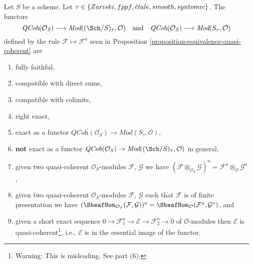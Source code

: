 \begin{lemma}
\label{lemma-equivalence-quasi-coherent-limits}
Let $S$ be a scheme.
Let $\tau \in \{Zariski, \linebreak[0] fppf, \linebreak[0]
\acute{e}tale, \linebreak[0] smooth, \linebreak[0] syntomic\}$.
The functors
$$
\textit{QCoh}(\mathcal{O}_S)
\longrightarrow
\textit{Mod}((\Sch/S)_\tau, \mathcal{O})
\quad\text{and}\quad
\textit{QCoh}(\mathcal{O}_S)
\longrightarrow
\textit{Mod}(S_\tau, \mathcal{O})
$$
defined by the rule $\mathcal{F} \mapsto \mathcal{F}^a$ seen in
Proposition \ref{proposition-equivalence-quasi-coherent}
are
\begin{enumerate}
\item fully faithful,
\item compatible with direct sums,
\item compatible with colimits,
\item right exact,
\item exact as a functor
$\textit{QCoh}(\mathcal{O}_S) \to \textit{Mod}(S_\tau, \mathcal{O})$,
\item {\bf not} exact as a functor
$\textit{QCoh}(\mathcal{O}_S) \to
\textit{Mod}((\Sch/S)_\tau, \mathcal{O})$
in general,
\item given two quasi-coherent $\mathcal{O}_S$-modules
$\mathcal{F}$, $\mathcal{G}$ we have
$(\mathcal{F} \otimes_{\mathcal{O}_S} \mathcal{G})^a =
\mathcal{F}^a \otimes_\mathcal{O} \mathcal{G}^a$,
\item given two quasi-coherent $\mathcal{O}_S$-modules
$\mathcal{F}$, $\mathcal{G}$ such that $\mathcal{F}$
is of finite presentation we have
$(\SheafHom_{\mathcal{O}_S}(\mathcal{F}, \mathcal{G}))^a =
\SheafHom_\mathcal{O}(\mathcal{F}^a, \mathcal{G}^a)$, and
\item given a short exact sequence
$0 \to \mathcal{F}_1^a \to \mathcal{E} \to \mathcal{F}_2^a \to 0$
of $\mathcal{O}$-modules then $\mathcal{E}$ is
quasi-coherent\footnote{Warning: This is misleading. See part (6).}, i.e.,
$\mathcal{E}$ is in the essential image of the functor.
\end{enumerate}
\end{lemma}

